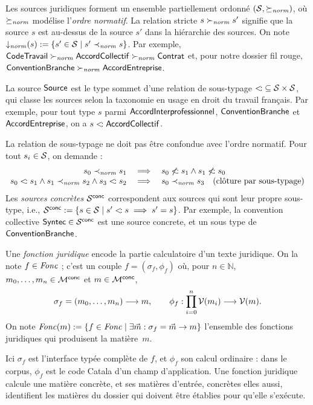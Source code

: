 \documentclass[review]{jflart}
\begin{document}
\begin{defi}\label{def:source}
Les sources juridiques forment un ensemble partiellement ordonné
\((\mathcal{S},\succeq_{\mathit{norm}})\), où \(\succeq_{\mathit{norm}}\) modélise l'\emph{ordre normatif}. La
relation stricte \(s\succ_{\mathit{norm}} s'\) signifie que la source \(s\) est au-dessus de
la source \(s'\) dans la hiérarchie des sources. On note
\(\mathop{\downarrow_{\mathit{norm}}}(s):=\{s'\in\mathcal{S}\mid s'\prec_{\mathit{norm}} s\}\). Par exemple, $\mathsf{CodeTravail}\succ_{\mathit{norm}}\mathsf{AccordCollectif}\succ_{\mathit{norm}}\mathsf{Contrat}$ et, pour notre dossier fil rouge, \(\mathsf{ConventionBranche}\succ_{\mathit{norm}}\mathsf{AccordEntreprise}\).

La source \(\mathsf{Source}\) est le type sommet d'une relation de sous-typage
\({\mathrel{<\!:}}\subseteq\mathcal{S}\times\mathcal{S}\), qui classe les sources
selon la taxonomie en usage en droit du travail français. Par exemple, pour tout type \(s\) parmi \(\mathsf{AccordInterprofessionnel}\), \(\mathsf{ConventionBranche}\) et \(\mathsf{AccordEntreprise}\), on a \(s\mathrel{<\!:}\mathsf{AccordCollectif}\).

La relation de sous-typage ne doit pas être confondue avec l'ordre normatif. Pour tout \(s_i\in\mathcal{S}\), on demande :
\[
\begin{array}{rll}
s_0\prec_{\mathit{norm}} s_1&\implies& {s_0 \not\mathrel{<\!:} s_1} \wedge {s_1\not\mathrel{<\!:}s_0}\\
{s_0\mathrel{<\!:} s_1}\wedge {s_1\prec_{\mathit{norm}}s_2}\wedge {s_3\mathrel{<\!:}s_2}& \implies &s_0\prec_{\mathit{norm}} s_3\quad \text{(clôture par sous-typage)}
\end{array}
\]
Les \emph{sources concrètes} $\mathcal{S}^{\mathsf{conc}}$ correspondent aux sources qui sont leur propre sous-type, i.e., \(\mathcal{S}^{\mathsf{conc}}:=\{s\in\mathcal{S}\mid s'\mathrel{<\!:} s\implies s'=s\}\). Par exemple, la convention collective $\mathsf{Syntec}\in\mathcal{S}^{\mathsf{conc}}$ est une source concrete, et un sous type de $\mathsf{ConventionBranche}$.
\end{defi}

\begin{defi}\label{def:fonction}
Une \emph{fonction juridique} encode la partie calculatoire d'un texte juridique. On
la note \(f\in\mathit{Fonc}\) ; c'est un couple \(f=(\sigma_f,\phi_f)\) où, pour
\(n\in\mathbb N\), \(m_0,\ldots,m_n\in\mathcal{M}^{\mathsf{conc}}\) et \(m\in\mathcal{M}^{\mathsf{conc}}\),
\[
 \sigma_f=(m_0,\ldots,m_n)\longrightarrow m,
 \qquad
 \phi_f:\prod_{i=0}^{n}\mathcal{V}(m_i)\longrightarrow\mathcal{V}(m).
\]
On note \(\mathit{Fonc}(m):=\{f\in\mathit{Fonc}\mid\exists \vec m:\sigma_f=\vec m\to m\}\)
l'ensemble des fonctions juridiques qui produisent la matière~\(m\).
\end{defi}

Ici \(\sigma_f\) est l'interface typée complète de \(f\), et \(\phi_f\) son
calcul ordinaire : dans le corpus, \(\phi_f\) est le code Catala d'un champ
d'application. Une fonction juridique calcule une
matière concrète, et ses matières d'entrée, concrètes elles aussi, identifient
les matières du dossier qui doivent être établies pour qu'elle s'exécute.
\end{document}
